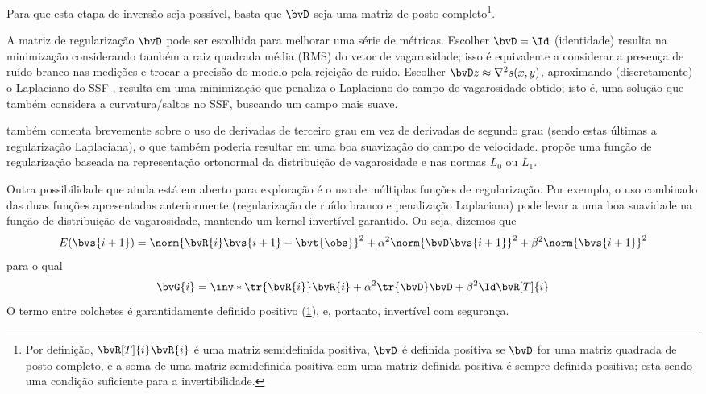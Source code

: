 Para que esta etapa de inversão seja possível, basta que $\bvD$ seja uma matriz de posto completo\footnote{\label{footnote:positive-definite_inversion}Por definição, $\bvR[T]{i} \bvR{i}$ é uma matriz semidefinida positiva, $\bvD$ é definida positiva se $\bvD$ for uma matriz quadrada de posto completo, e a soma de uma matriz semidefinida positiva com uma matriz definida positiva é sempre definida positiva; esta sendo uma condição suficiente para a invertibilidade.}.

A matriz de regularização $\bvD$ pode ser escolhida para melhorar uma série de métricas. Escolher $\bvD = \Id$ (identidade) \cite{phillips_traveltime_1991} resulta na minimização considerando também a raiz quadrada média (RMS) do vetor de vagarosidade; isso é equivalente a considerar a presença de ruído branco nas medições e trocar a precisão do modelo pela rejeição de ruído. Escolher $\bvD z \approx \nabla^2 s(x,y)$, aproximando (discretamente) o Laplaciano do SSF \cite{zhang_nonlinear_1998,ali_opensource_2019}, resulta em uma minimização que penaliza o Laplaciano do campo de vagarosidade obtido; isto é, uma solução que também considera a curvatura/saltos no SSF, buscando um campo mais suave.

\citet{zhang_nonlinear_1998} também comenta brevemente sobre o uso de derivadas de terceiro grau em vez de derivadas de segundo grau (sendo estas últimas a regularização Laplaciana), o que também poderia resultar em uma boa suavização do campo de velocidade. \citet{hormati_robust_2010} propõe uma função de regularização baseada na representação ortonormal da distribuição de vagarosidade e nas normas $L_0$ ou $L_1$.

Outra possibilidade que ainda está em aberto para exploração é o uso de múltiplas funções de regularização. Por exemplo, o uso combinado das duas funções apresentadas anteriormente (regularização de ruído branco e penalização Laplaciana) pode levar a uma boa suavidade na função de distribuição de vagarosidade, mantendo um kernel invertível garantido. Ou seja, dizemos que
\begin{equation}	
	E(\bvs{i+1}) = \norm{\bvR{i} \bvs{i+1} - \bvt{\obs}}^2 + \alpha^2\norm{\bvD\bvs{i+1}}^2 + \beta^2 \norm{\bvs{i+1}}^2
\end{equation}
para o qual
\begin{equation}	
	\bvG{i} = \inv*{\tr{\bvR{i}} \bvR{i} + \alpha^2 \tr{\bvD}\bvD + \beta^2 \Id} \bvR[T]{i}
\end{equation}
O termo entre colchetes é garantidamente definido positivo (\cref{footnote:positive-definite_inversion}), e, portanto, invertível com segurança.

